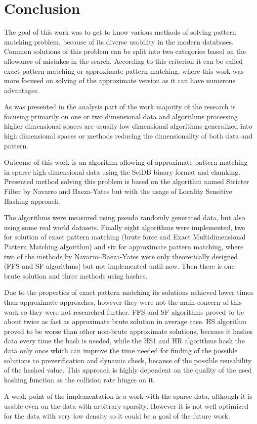 \chapter{Conclusion}\label{conclusion}
The goal of this work was to get to know various methods of solving pattern matching problem, because of its diverse usability in the modern databases. Common solutions of this problem can be split into two categories based on the allowance of mistakes in the search. According to this criterion it can be called exact pattern matching or approximate pattern matching, where this work was more focused on solving of the approximate version as it can have numerous advantages. 

As was presented in the analysis part of the work majority of the research is focusing primarily on one or two dimensional data and algorithms processing higher dimensional spaces are usually low dimensional algorithms generalized into high dimensional spaces or methods reducing the dimensionality of both data and pattern. 

Outcome of this work is an algorithm allowing of approximate pattern matching in sparse high dimensional data using the SciDB binary format and chunking. Presented method solving this problem is based on the algorithm named Stricter Filter by Navarro and Baeza-Yates but with the usage of Locality Sensitive Hashing approach. 

The algorithms were measured using pseudo randomly generated data, but also using some real world datasets. Finally eight algorithms were implemented, two for solution of exact pattern matching (brute force and Exact Multidimensional Pattern Matching algorithm) and six for approximate pattern matching, where two of the methods by Navarro--Baeza-Yates were only theoretically designed (FFS and SF algorithms) but not implemented until now. Then there is one brute solution and three methods using hashes.

Due to the properties of exact pattern matching its solutions achieved lower times than approximate approaches, however they were not the main concern of this work so they were not researched further.
FFS and SF algorithms proved to be about twice as fast as approximate brute solution in average case.
HS algorithm proved to be worse than other non-brute approximate solutions, because it hashes data every time the hash is needed, while the HS1 and HR algorithms hash the data only once which can improve the time needed for finding of the possible solutions to preverification and dynamic check, because of the possible reusability of the hashed value. This approach is highly dependent on the quality of the used hashing function as the collision rate hinges on it.

A weak point of the implementation is a work with the sparse data, although it is usable even on the data with arbitrary sparsity. However it is not well optimized for the data with very low density so it could be a goal of the future work. 